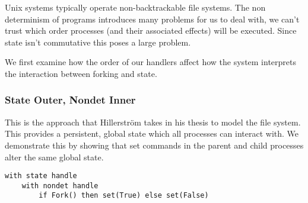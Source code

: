 \documentclass[logo,bsc,singlespacing,parskip]{infthesis}
\begin{document}
Unix systems typically operate non-backtrackable file systems. The non determinism of programs introduces many problems for us to deal with, we can't trust which order processes (and their associated effects) will be executed. Since state isn't commutative this poses a large problem.

We first examine how the order of our handlers affect how the system interprets the interaction between forking and state.

\subsubsection*{State Outer, Nondet Inner}
This is the approach that Hillerström takes in his thesis to model the file system. This provides a persistent, global state which all processes can interact with. We demonstrate this by showing that set commands in the parent and child processes alter the same global state.



\begin{verbatim}
with state handle
    with nondet handle
        if Fork() then set(True) else set(False)
\end{verbatim}
\end{document}
